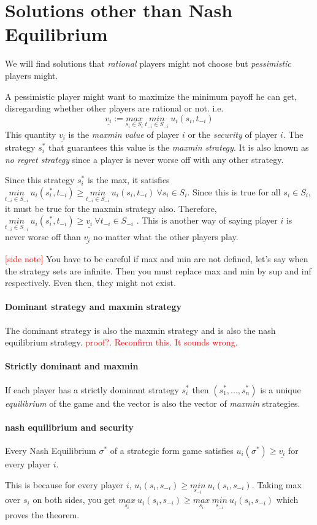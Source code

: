 \section{Solutions other than Nash Equilibrium}
We will find solutions that \textit{rational} players might not choose but \textit{pessimistic} players might.

A pessimistic player might want to maximize the minimum payoff he can get, disregarding whether other players are rational or not. i.e. 
\[
	\underline{v_i} := \underset{s_i \in S_i}{max}~\underset{t_{-i} \in S_{-i}}{min}~u_i(s_i, t_{-i})
\]
This quantity $\underline{v_i}$ is the \textit{maxmin value} of player $i$ or the \textit{security} of player $i$. The strategy $s_i^*$ that guarantees this value is the \textit{maxmin strategy}. It is also known as \textit{no regret strategy} since a player is never worse off with any other strategy.

Since this strategy $s_i^*$ is the max, it satisfies $\underset{t_{-i} \in S_{-i}}{min}~u_i(s_i^*, t_{-i}) \geq \underset{t_{-i} \in S_{-i}}{min}~u_i(s_i, t_{-i})~ \forall s_i \in S_i$. Since this is true for all $s_i \in S_i$, it must be true for the maxmin strategy also. Therefore, $\underset{t_{-i} \in S_{-i}}{min}~u_i(s_i^*, t_{-i}) \geq \underline{v_i} ~ \forall t_{-i} \in S_{-i}$ . This is another way of saying player $i$ is never worse off than $\underline{v_i}$ no matter what the other players play.

\textcolor{red}{[side note]} You have to be careful if max and min are not defined, let's say when the strategy sets are infinite. Then you must replace max and min by sup and inf respectively. Even then, they might not exist.

\paragraph{Dominant strategy and maxmin strategy} The dominant strategy is also the maxmin strategy and is also the nash equilibrium strategy.
\textcolor{red}{proof?. Reconfirm this. It sounds wrong.}

\paragraph{Strictly dominant and maxmin} If each player has a strictly dominant strategy $s_i^*$ then $(s_1^*, ..., s_n^*)$ is a unique \textit{equilibrium }of the game and the vector is also the vector of \textit{maxmin }strategies.

\paragraph{nash equilibrium and security} Every Nash Equilibrium $\sigma^*$ of a strategic form game satisfies $u_i(\sigma^*) \geq \underline{v_i}$ for every player $i$.

This is because for every player $i$, $u_i(s_i, s_{-i}) \geq \underset{s_{-i}}{min}~u_i(s_i, s_{-i})$. Taking max over $s_i$ on both sides, you get $\underset{s_i}{max} ~u_i(s_i, s_{-i}) \geq \underset{s_i}{max} ~\underset{s_{-i}}{min}~u_i(s_i, s_{-i})$ which proves the theorem.